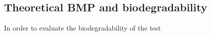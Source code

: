 \subsection{Theoretical BMP and biodegradability}
In order to evaluate the biodegradability of the test
